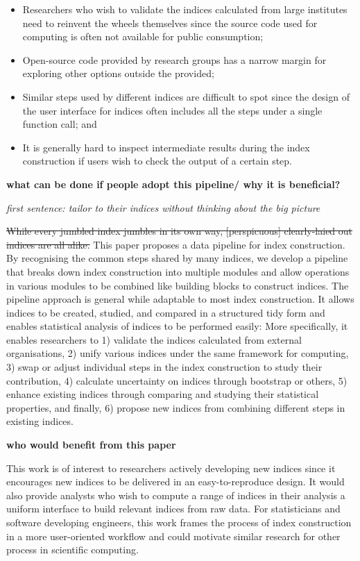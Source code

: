 \documentclass[
]{article}
\providecommand{\tightlist}{%
  \setlength{\itemsep}{0pt}\setlength{\parskip}{0pt}}\usepackage{longtable,booktabs,array}
\begin{document}
\begin{itemize}
\tightlist
\item
  Researchers who wish to validate the indices calculated from large
  institutes need to reinvent the wheels themselves since the source
  code used for computing is often not available for public consumption;
\item
  Open-source code provided by research groups has a narrow margin for
  exploring other options outside the provided;
\item
  Similar steps used by different indices are difficult to spot since
  the design of the user interface for indices often includes all the
  steps under a single function call; and
\item
  It is generally hard to inspect intermediate results during the index
  construction if users wish to check the output of a certain step.
\end{itemize}

\textbf{what can be done if people adopt this pipeline/ why it is
beneficial?}

\emph{first sentence: tailor to their indices without thinking about the
big picture}

\sout{While every jumbled index jumbles in its own way,
{[}perspicuous{]} clearly-laied out indices are all alike.} This paper
proposes a data pipeline for index construction. By recognising the
common steps shared by many indices, we develop a pipeline that breaks
down index construction into multiple modules and allow operations in
various modules to be combined like building blocks to construct
indices. The pipeline approach is general while adaptable to most index
construction. It allows indices to be created, studied, and compared in
a structured tidy form and enables statistical analysis of indices to be
performed easily: More specifically, it enables researchers to 1)
validate the indices calculated from external organisations, 2) unify
various indices under the same framework for computing, 3) swap or
adjust individual steps in the index construction to study their
contribution, 4) calculate uncertainty on indices through bootstrap or
others, 5) enhance existing indices through comparing and studying their
statistical properties, and finally, 6) propose new indices from
combining different steps in existing indices.

\textbf{who would benefit from this paper}

This work is of interest to researchers actively developing new indices
since it encourages new indices to be delivered in an easy-to-reproduce
design. It would also provide analysts who wish to compute a range of
indices in their analysis a uniform interface to build relevant indices
from raw data. For statisticians and software developing engineers, this
work frames the process of index construction in a more user-oriented
workflow and could motivate similar research for other process in
scientific computing.
\end{document}
